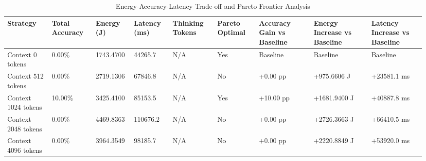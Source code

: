 \begin{table}
\caption{Energy-Accuracy-Latency Trade-off and Pareto Frontier Analysis}
\label{tab:tradeoff_comparison}
\begin{tabular}{lllllllll}
\toprule
Strategy & Total Accuracy & Energy (J) & Latency (ms) & Thinking Tokens & Pareto Optimal & Accuracy Gain vs Baseline & Energy Increase vs Baseline & Latency Increase vs Baseline \\
\midrule
Context 0 tokens & 0.00\% & 1743.4700 & 44265.7 & N/A & Yes & Baseline & Baseline & Baseline \\
Context 512 tokens & 0.00\% & 2719.1306 & 67846.8 & N/A & No & +0.00 pp & +975.6606 J & +23581.1 ms \\
Context 1024 tokens & 10.00\% & 3425.4100 & 85153.5 & N/A & Yes & +10.00 pp & +1681.9400 J & +40887.8 ms \\
Context 2048 tokens & 0.00\% & 4469.8363 & 110676.2 & N/A & No & +0.00 pp & +2726.3663 J & +66410.5 ms \\
Context 4096 tokens & 0.00\% & 3964.3549 & 98185.7 & N/A & No & +0.00 pp & +2220.8849 J & +53920.0 ms \\
\bottomrule
\end{tabular}
\end{table}

